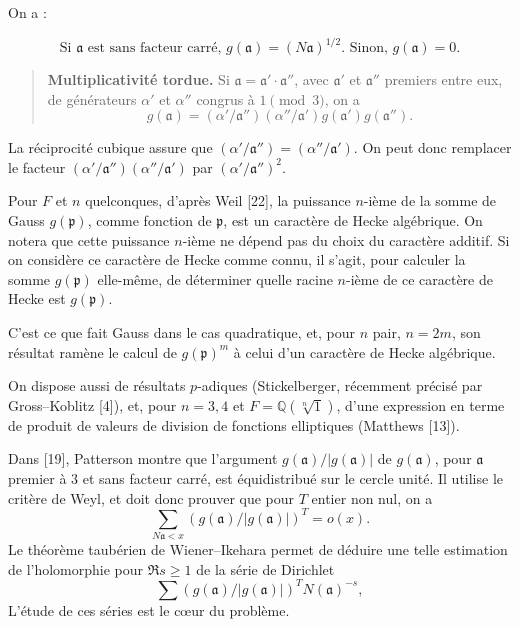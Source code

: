 \documentclass[12pt,a4paper]{article}
\theoremstyle{plain}
\theoremstyle{definition}
\theoremstyle{remark}
\newcommand{\QQ}{\mathbb{Q}}
\newcommand{\frakp}{\mathfrak{p}}
\newcommand{\fraka}{\mathfrak{a}}
\providecommand{\QQ}{\mathbb{Q}}
\providecommand{\fraka}{\mathfrak{a}}
\providecommand{\frakp}{\mathfrak{p}}
\begin{document}
On a :

\begin{equation}\label{eq:0.3}
\text{Si $\fraka$ est sans facteur carré, } g(\fraka) = (N\fraka)^{1/2}. \text{ Sinon, } g(\fraka) = 0.
\tag{0.3}
\end{equation}

\begin{quote}
\textbf{Multiplicativit\'e tordue.} Si $\fraka = \fraka' \cdot \fraka''$, avec $\fraka'$ et $\fraka''$ premiers entre eux, de g\'en\'erateurs $\alpha'$ et $\alpha''$ congrus \`a $1 \pmod 3$, on a
\[
g(\fraka) = (\alpha'/\fraka'')(\alpha''/\fraka') g(\fraka') g(\fraka'').
\]
\end{quote}

La réciprocité cubique assure que $(\alpha'/\fraka'') = (\alpha''/\fraka')$. On peut donc remplacer le facteur $(\alpha'/\fraka'')(\alpha''/\fraka')$ par $(\alpha'/\fraka'')^2$.

Pour $F$ et $n$ quelconques, d'après Weil [22], la puissance $n$-ième de la somme de Gauss $g(\frakp)$, comme fonction de $\frakp$, est un caractère de Hecke algébrique. On notera que cette puissance $n$-ième ne dépend pas du choix du caractère additif. Si on considère ce caractère de Hecke comme connu, il s'agit, pour calculer la somme $g(\frakp)$ elle-même, de déterminer quelle racine $n$-ième de ce caractère de Hecke est $g(\frakp)$.

C'est ce que fait Gauss dans le cas quadratique, et, pour $n$ pair, $n = 2m$, son résultat ramène le calcul de $g(\frakp)^m$ à celui d'un caractère de Hecke algébrique.

On dispose aussi de résultats $p$-adiques (Stickelberger, récemment précisé par Gross--Koblitz [4]), et, pour $n = 3, 4$ et $F = \QQ(\sqrt[n]{1})$, d'une expression en terme de produit de valeurs de division de fonctions elliptiques (Matthews [13]).

Dans [19], Patterson montre que l'argument $g(\fraka)/|g(\fraka)|$ de $g(\fraka)$, pour $\fraka$ premier à $3$ et sans facteur carré, est équidistribué sur le cercle unité. Il utilise le critère de Weyl, et doit donc prouver que pour $T$ entier non nul, on a
\begin{equation}\label{eq:0.5}
\sum_{N\fraka < x} (g(\fraka)/|g(\fraka)|)^T = o(x).
\tag{0.5}
\end{equation}
Le théorème taubérien de Wiener--Ikehara permet de déduire une telle estimation de l'holomorphie pour $\Re s \geq 1$ de la série de Dirichlet
\begin{equation}\label{eq:0.6}
\sum (g(\fraka)/|g(\fraka)|)^T N(\fraka)^{-s},
\tag{0.6}
\end{equation}
L'étude de ces séries est le cœur du problème.
\end{document}
